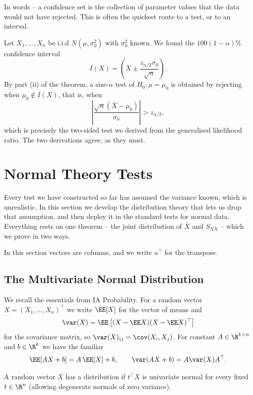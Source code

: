 In words -- a confidence set is the collection of parameter values that the data would not have rejected. This is often the quickest route to a test, or to an interval.

\begin{example}
  Let $X_1,\dots,X_n$ be i.i.d $N(\mu,\sigma_0^2)$ with $\sigma_0^2$ known. We found the $100(1-\alpha)\%$ confidence interval
  $$
  I(X) = \left(\overline{X} \pm \frac{z_{\alpha/2}\sigma_0}{\sqrt{n}}\right).
  $$
  By part (ii) of the theorem, a size-$\alpha$ test of $H_0 : \mu = \mu_0$ is obtained by rejecting when $\mu_0 \notin I(X)$, that is, when
  $$
  \left|\frac{\sqrt{n}(\overline{X}-\mu_0)}{\sigma_0}\right| > z_{\alpha/2},
  $$
  which is precisely the two-sided test we derived from the generalised likelihood ratio. The two derivations agree, as they must.
\end{example}


\section{Normal Theory Tests}

Every test we have constructed so far has assumed the variance known, which is unrealistic. In this section we develop the distribution theory that lets us drop that assumption, and then deploy it in the standard tests for normal data. Everything rests on one theorem -- the joint distribution of $\overline{X}$ and $S_{XX}$ -- which we prove in two ways.

In this section vectors are columns, and we write $u^\top$ for the transpose.

\subsection{The Multivariate Normal Distribution}

We recall the essentials from IA Probability. For a random vector $X = (X_1,\dots,X_n)^\top$ we write $\EE[X]$ for the vector of means and
$$
\var(X) = \EE\left[(X - \EE X)(X - \EE X)^\top\right]
$$
for the covariance matrix, so $\var(X)_{ij} = \cov(X_i, X_j)$. For constant $A \in \R^{k\times n}$ and $b \in \R^k$ we have the familiar
$$
\EE[AX + b] = A\,\EE[X] + b, \qquad \var(AX+b) = A\var(X)A^\top.
$$

\begin{definition}
  A random vector $X$ has a  distribution if $t^\top X$ is univariate normal for every fixed $t \in \R^n$ (allowing degenerate normals of zero variance).
\end{definition}

